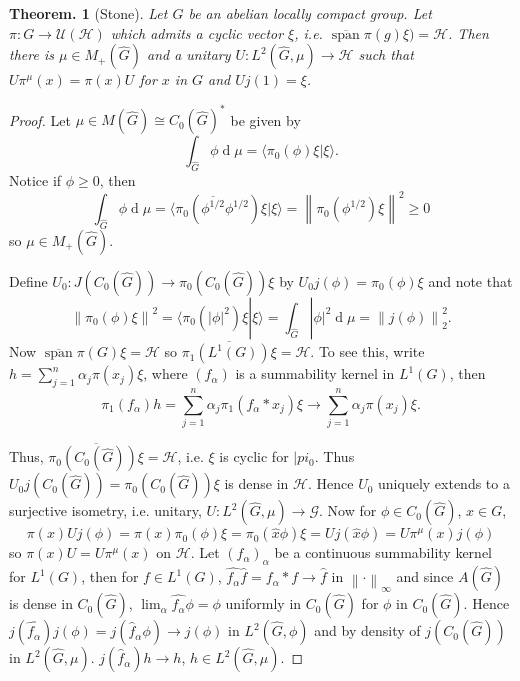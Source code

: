 \documentclass[11pt, a4paper]{memoir}
\newcommand{\norm}[1]{\ensuremath{\left\lVert#1\right\rVert}}
\theoremstyle{change}
\newtheorem{theorem}{Theorem.}[section]
\theoremstyle{plain}
\theoremstyle{nonumberplain}
\newtheorem{proof}{Proof}
\DeclareMathOperator{\spn}{span}
\renewcommand{\d}[1]{\ensuremath{\operatorname{d}\!{#1}}}
\numberwithin{equation}{section}
\begin{document}
\begin{theorem}[Stone]
    Let $G$ be an abelian locally compact group.
    Let $\pi:G\to\mathcal{U}(\mathcal{H})$ which admits a cyclic vector $\xi$, i.e. $\overline{\spn}\pi(g)\xi)=\mathcal{H}$.
    Then there is $\mu\in M_+(\widehat{G})$ and a unitary $U:L^2(\widehat{G},\mu)\to\mathcal{H}$ such that $U\pi^\mu(x)=\pi(x)U$ for $x$ in $G$ and $Uj(1)=\xi$.
\end{theorem}
\begin{proof}
    Let $\mu\in M(\widehat{G})\cong C_0(\widehat{G})^*$ be given by
    \begin{equation*}
        \int_{\widehat{G}}\phi\d{\mu}=\langle\pi_0(\phi)\xi|\xi\rangle.
    \end{equation*}
    Notice if $\phi\geq 0$, then
    \begin{equation*}
        \int_{\widehat{G}}\phi\d{\mu}=\langle\pi_0(\overline{\phi^{1/2}}\phi^{1/2})\xi|\xi\rangle=\norm{\pi_0(\phi^{1/2})\xi}^2\geq 0
    \end{equation*}
    so $\mu\in M_+(\widehat{G})$.

    Define $U_0:J(C_0(\widehat{G}))\to\pi_0(C_0(\widehat{G}))\xi$ by $U_0j(\phi)=\pi_0(\phi)\xi$ and note that
    \begin{equation*}
        \norm{\pi_0(\phi)\xi}^2=\langle\pi_0(|\phi|^2)\xi|\xi\rangle=\int_{\widehat{G}}|\phi|^2\d{\mu} = \norm{j(\phi)}_2^2.
    \end{equation*}
    Now $\overline{\spn}\pi(G)\xi=\mathcal{H}$ so $\overline{\pi_1(L^1(G))\xi}=\mathcal{H}$.
    To see this, write $h=\sum_{j=1}^n\alpha_j\pi(x_j)\xi$, where $(f_\alpha)$ is a summability kernel in $L^1(G)$, then
    \begin{equation*}
        \pi_1(f_\alpha)h=\sum_{j=1}^n\alpha_j\pi_1(f_\alpha*x_j)\xi\to\sum_{j=1}^n\alpha_j\pi(x_j)\xi.
    \end{equation*}

    Thus, $\overline{\pi_0(C_0(\widehat{G}))\xi}=\mathcal{H}$, i.e. $\xi$ is cyclic for $|pi_0$.
    Thus $U_0j(C_0(\widehat{G}))=\pi_0(C_0(\widehat{G}))\xi$ is dense in $\mathcal{H}$.
    Hence $U_0$ uniquely extends to a surjective isometry, i.e. unitary, $U:L^2(\widehat{G},\mu)\to\mathcal{G}$.
    Now for $\phi\in C_0(\widehat{G})$, $x\in G$,
    \begin{equation*}
        \pi(x)Uj(\phi)=\pi(x)\pi_0(\phi)\xi=\pi_0(\hat{x}\phi)\xi=Uj(\hat{x}\phi)=U\pi^\mu(x)j(\phi)
    \end{equation*}
    so $\pi(x)U=U\pi^\mu(x)$ on $\mathcal{H}$.
    Let $(f_\alpha)_\alpha$ be a continuous summability kernel for $L^1(G)$, then for $f\in L^1(G)$, $\hat{f_\alpha}\hat{f}=\widehat{f_\alpha*f}\to\hat{f}$ in $\norm{\cdot}_\infty$ and since $A(\widehat{G})$ is dense in $C_0(\widehat{G})$, $\lim_\alpha\widehat{f_\alpha}\phi=\phi$ uniformly in $C_0(\widehat{G})$ for $\phi$ in $C_0(\widehat{G})$.
    Hence $j(\widehat{f_\alpha})j(\phi)=j(\hat{f}_\alpha\phi)\to j(\phi)$ in $L^2(\widehat{G},\phi)$ and by density of $j(C_0(\widehat{G}))$ in $L^2(\widehat{G},\mu)$. $j(\hat{f}_\alpha)h\to h$, $h\in L^2(\widehat{G},\mu)$.
    

\end{proof}
\end{document}
